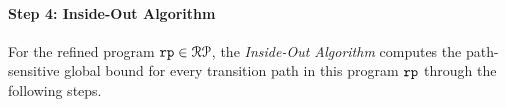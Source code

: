   \paragraph{Step 4: Inside-Out Algorithm}
  For the refined program $\mathtt{rp} \in \mathcal{RP}$, the \emph{Inside-Out Algorithm}
  computes the path-sensitive global bound for every transition path in this program $\mathtt{rp}$ through the following steps.
  
